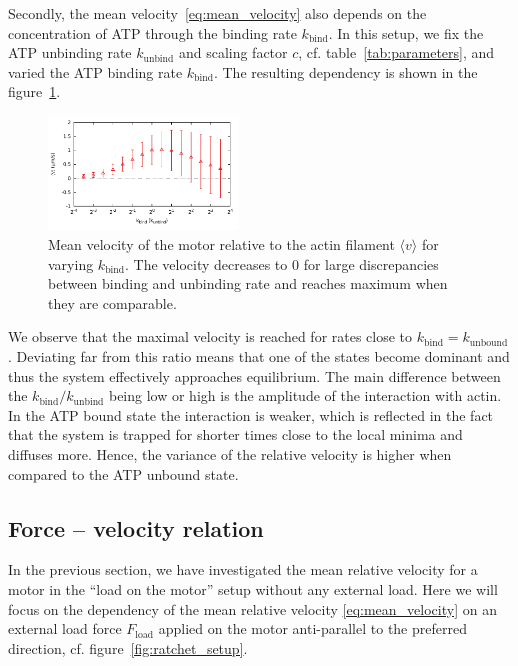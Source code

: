 \documentclass[aps,pre,twocolumn,showpacs,showkeys,superscriptaddress,floatfix]{revtex4-1}
\begin{document}
Secondly, the mean velocity~\eqref{eq:mean_velocity} also depends on the concentration of ATP through the binding rate $k_\text{bind}$. 
In this setup, we fix the ATP unbinding rate $k_\text{unbind}$ and scaling factor $c$, cf. table~\ref{tab:parameters}, and varied the ATP binding rate $k_\text{bind}$. 
The resulting dependency is shown in the figure~\ref{fig:v_k}. 
\begin{figure}[t]
\centering
\includegraphics[width=0.45\textwidth,height=!]{v_k}
\caption{
\label{fig:v_k} 
Mean velocity of the motor relative to the actin filament $\langle v \rangle$ for varying $k_\text{bind}$.
The velocity decreases to $0$ for large discrepancies between binding and unbinding rate and reaches maximum when they are comparable.
}
\end{figure}
We observe that the maximal velocity is reached for rates close to $k_\text{bind} = k_\text{unbound}$. 
Deviating far from this ratio means that one of the states become dominant and thus the system effectively approaches equilibrium.  
The main difference between the $k_\text{bind}/k_\text{unbind}$ being low or high is the amplitude of the interaction with actin. 
In the ATP bound state the interaction is weaker, 
which is reflected in the fact that the system is trapped for shorter times close to the local minima and diffuses more. 
Hence, the variance of the relative velocity is higher when compared to the ATP unbound state. 


\subsection{Force -- velocity relation}
\label{sec:force-velocity}
In the previous section, we have investigated the mean relative velocity for a motor in the ``load on the motor'' setup without any external load. 
Here we will focus on the dependency of the mean relative velocity \eqref{eq:mean_velocity} on an external load force $F_\text{load}$ applied on the motor anti-parallel to the preferred direction, 
cf. figure~\ref{fig:ratchet_setup}.
\end{document}
